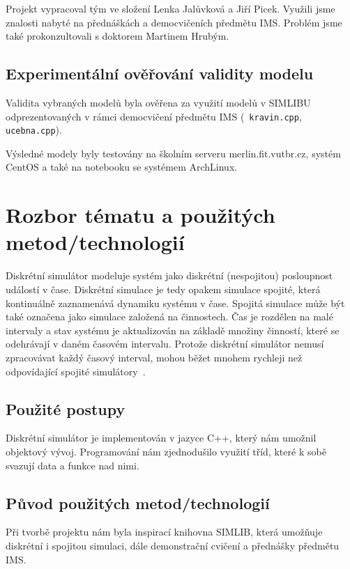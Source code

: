 \documentclass[12pt,a4paper,titlepage,final]{article}
\begin{document}
Projekt vypracoval tým ve složení Lenka Jalůvková a Jiří Picek. Využili jsme znalosti nabyté na přednáškách a democvičeních předmětu IMS. Problém jsme také prokonzultovali s doktorem Martinem Hrubým.

\subsection{Experimentální ověřování validity modelu}

Validita vybraných modelů byla ověřena za využití modelů v SIMLIBU odprezentovaných v rámci democvičení předmětu IMS (\cite{priklady}~\texttt{kravin.cpp}, \texttt{ucebna.cpp}). 

Výsledné modely byly testovány na školním serveru merlin.fit.vutbr.cz, systém CentOS a také na notebooku se systémem ArchLinux.
 
\section{Rozbor tématu a použitých metod/technologií}

Diskrétní simulátor modeluje systém jako diskrétní (nespojitou) posloupnost událostí v čase. Diskrétní simulace je tedy opakem simulace spojité, která kontinuálně zaznamenává dynamiku systému v čase. Spojitá simulace může být také označena jako simulace založená na činnostech. Čas je rozdělen na malé intervaly a stav systému je aktualizován na základě množiny činností, které se odehrávají v daném časovém intervalu. Protože diskrétní simulátor nemusí zpracovávat každý časový interval, mohou běžet mnohem rychleji než odpovídající spojité simulátory~\cite{simulace.info}. 

\subsection{Použité postupy}

Diskrétní simulátor je implementován v jazyce C++, který nám umožnil objektový vývoj. Programování nám zjednodušilo využití tříd, které k sobě svazují data a funkce nad nimi.

\subsection{Původ použitých metod/technologií}

Při tvorbě projektu nám byla inspirací knihovna SIMLIB, která umožňuje diskrétní i spojitou simulaci, dále demonstrační cvičení a přednášky předmětu IMS.
\end{document}
